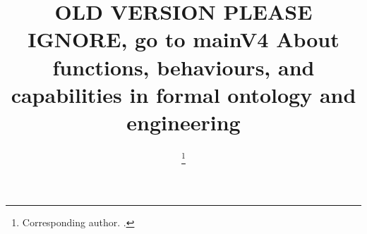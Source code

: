 \documentclass[sw]{iosart2x}
\begin{document}
\begin{frontmatter}

\title{{\color{red} OLD VERSION PLEASE IGNORE, go to mainV4 }About functions, behaviours, and capabilities in formal ontology and engineering}


\begin{aug}
\author[A]{ %
\thanks{Corresponding author. .}}
\author[B]{ }
\author[B]{ }
\address[A]{Department first, ,
Abbreviate US states, }
\address[B]{Department first, ,
Abbreviate US states, }
\end{aug}



\end{frontmatter}
\end{document}
